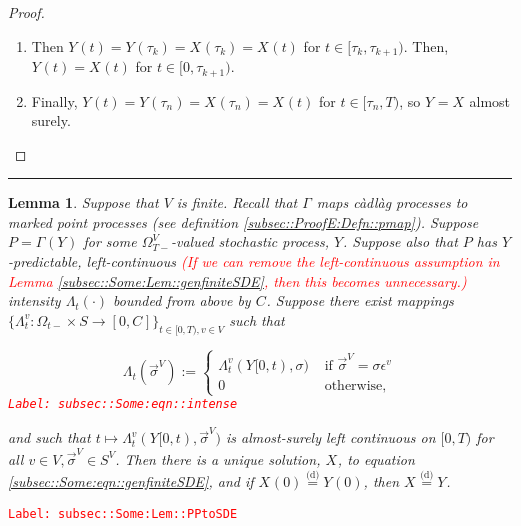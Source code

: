 \documentclass[12pt]{article}
\newcommand{\ra}{\rightarrow}
\newcommand{\te}{\text}
\newcommand{\ep}{\epsilon}
\newcommand{\tr}{\textcolor{red}}
\newcommand{\labe}[1]{\tr{\texttt{Label: #1}}}
\newcommand{\lin}{\rule{\linewidth}{0.4 pt}}
\newcommand{\deq}{\overset{\text{(d)}}{=}}			%
\renewcommand{\v}{v}							%
\renewcommand{\S}{S}							%
\newcommand{\s}{\sigma}							%
\newcommand{\sv}{\vec{\s}}						%
\newcommand{\ev}{\ep}							%
\newcommand{\T}{T}								%
\renewcommand{\t}{t}							%
\newcommand{\sset}{\Omega}						%
\newcommand{\X}{X}								%
\newcommand{\vind}[1]{^{#1}}					%
\newcommand{\carp}[1]{^{#1}}					%
\newcommand{\vsi}[1]{^{#1}}						%
\newcommand{\cind}[1]{_{#1}}					%
\newcommand{\tp}[1]{(#1)}						%
\newcommand{\tip}[1]{#1}						%
\newcommand{\ts}[1]{_{#1}}						%
\newcommand{\const}{C}							%
\newcommand{\indx}[1]{_{#1}}					%
\newcommand{\XX}{Y}								%
\newcommand{\rt}{\tau}							%
\renewcommand{\it}{k}							%
\newcommand{\pmap}{\Gamma}						%
\newcommand{\rp}{P}								%
\newcommand{\ratee}{\Lambda}					%
\newtheorem{lem}[thms]{Lemma}
\begin{document}
\begin{proof}
\begin{enumerate}
\item Then \(\XX\cind{}\tp{\t} = \XX\cind{}\tp{\rt\indx{\it}} = \X\cind{}\tp{\rt\indx{\it}} = \X\cind{}\tp{\t}\) for \(\t \in [\rt\indx{\it},\rt\indx{\it+1})\). Then, \(\XX\cind{}\tp{\t} = \X\cind{}\tp{\t}\) for \(\t\in [0,\rt\indx{\it+1})\).

\item Finally, \(\XX\cind{}\tp{\t} = \XX\cind{}\tp{\rt\indx{n}} = \X\cind{}\tp{\rt\indx{n}} = \X\cind{}\tp{\t}\) for \(\t\in [\rt\indx{n},\T)\), so \(\XX\cind{}\tip{} = \X\cind{}\tip{}\) almost surely.
\end{enumerate}
\end{proof}

\lin

\begin{lem}
Suppose that \(V\) is finite. Recall that \(\pmap\vind{}\) maps c\`adl\`ag processes to marked point processes (see definition \ref{subsec::ProofE:Defn::pmap}). Suppose \(\rp{} = \pmap\vind{}(\XX\cind{}\tip{})\) for some \(\sset\vsi{V}\ts{\T-}\)-valued stochastic process, \(\XX\cind{}\tip{}\). Suppose also that \(\rp{}\) has \(\XX\cind{}\tip{}\)-predictable, left-continuous \tr{(If we can remove the left-continuous assumption in Lemma \ref{subsec::Some:Lem::genfiniteSDE}, then this becomes unnecessary.)} intensity \(\ratee\ts{\t}(\cdot)\) bounded from above by \(\const\indx{}\). Suppose there exist mappings \(\{\ratee\ts{\t}\vind{\v}:\sset\vsi{}\ts{\t-}\times \S \ra [0,\const\indx{}]\}_{\t\in[0,\T),\v\in V}\) such that 

\begin{equation}
\ratee\ts{\t}(\sv\cind{}\vsi{V}) := \begin{cases}
\ratee\ts{\t}\vind{\v}(\XX\cind{}\tip{[0,\t)},\s) &\te{ if } \sv\cind{}\vsi{V} = \s\ev\vind{\v}\\
0 &\te{ otherwise,}
\end{cases}
\label{subsec::Some:eqn::intense}
\end{equation}
\labe{subsec::Some:eqn::intense}

and such that \(\t\mapsto \ratee\ts{\t}\vind{\v}(\XX\cind{}\tip{[0,\t)},\sv\cind{}\vsi{V})\) is almost-surely left continuous on \([0,\T)\) for all \(\v\in V,\sv\cind{}\vsi{V}\in \S\carp{V}\). Then there is a unique solution, \(\X\cind{}\tip{}\), to equation \eqref{subsec::Some:eqn::genfiniteSDE}, and if \(\X\cind{}\tp{0} \deq \XX\cind{}\tp{0}\), then \(\X\cind{}\tip{} \deq \XX\cind{}\tip{}\).

\label{subsec::Some:Lem::PPtoSDE}
\end{lem}
\labe{subsec::Some:Lem::PPtoSDE}
\end{document}
